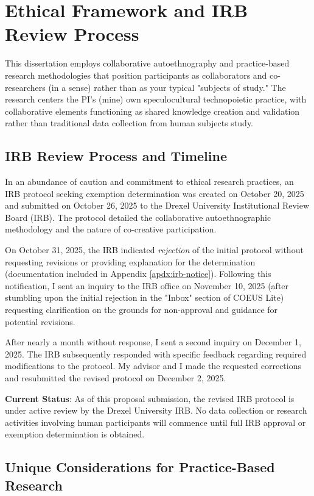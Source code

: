 \section*{Ethical Framework and IRB Review Process} 

This dissertation employs collaborative autoethnography and practice-based research methodologies that position participants as collaborators and co-researchers (in a sense) rather than as your typical "subjects of study." The research centers the PI's (mine) own speculocultural technopoietic practice, with collaborative elements functioning as shared knowledge creation and validation rather than traditional data collection from human subjects study. 

\subsection*{IRB Review Process and Timeline} 

In an abundance of caution and commitment to ethical research practices, an IRB protocol seeking exemption determination was created on October 20, 2025 and submitted on October 26, 2025 to the Drexel University Institutional Review Board (IRB). The protocol detailed the collaborative autoethnographic methodology and the nature of co-creative participation. 

On October 31, 2025, the IRB indicated \emph{rejection} of the initial protocol without requesting revisions or providing explanation for the determination (documentation included in Appendix \ref{apdx:irb-notice}). Following this notification, I sent an inquiry to the IRB office on November 10, 2025 (after stumbling upon the initial rejection in the "Inbox" section of COEUS Lite) requesting clarification on the grounds for non-approval and guidance for potential revisions.

After nearly a month without response, I sent a second inquiry on December 1, 2025. The IRB subsequently responded with specific feedback regarding required modifications to the protocol. My advisor and I made the requested corrections and resubmitted the revised protocol on December 2, 2025. 

\textbf{Current Status}: As of this proposal submission, the revised IRB protocol is under active review by the Drexel University IRB. No data collection or research activities involving human participants will commence until full IRB approval or exemption determination is obtained.

\subsection*{Unique Considerations for Practice-Based Research}

